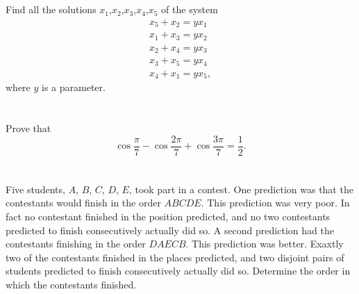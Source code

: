 \documentclass[12pt,a4paper]{article}
\begin{document}
\section{}
Find all the solutions $x_1$,$x_2$,$x_3$,$x_4$,$x_5$ of the system
\[
\begin{aligned}
x_5 + x_2 = yx_1 \\
x_1 + x_3 = yx_2 \\
x_2 + x_4 = yx_3 \\
x_3 + x_5 = yx_4 \\
x_4 + x_1 = yx_5,
\end{aligned}
\]
where $y$ is a parameter.

\section{}
Prove that
\[
\cos\frac{\pi}{7} - \cos\frac{2\pi}{7} + \cos\frac{3\pi}{7} = \frac{1}{2}.
\]

\section{}
Five students, $A$, $B$, $C$, $D$, $E$, took part in a contest. One prediction was that the contestants would finish in the order $ABCDE$. This prediction was very poor. In fact no contestant finished in the position predicted, and no two contestants predicted to finish consecutively actually did so. A second prediction had the contestants finishing in the order $DAECB$. This prediction was better. Exaxtly two of the contestants finished in the places predicted, and two disjoint pairs of students predicted to finish consecutively actually did so. Determine the order in which the contestants finished.
\end{document}
